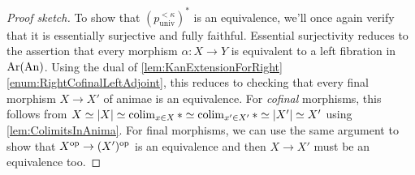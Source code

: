\begin{proof}[Proof sketch]
	To show that $(p_\mathrm{univ}^{<\kappa})^*$ is an equivalence, we'll once again verify that it is essentially surjective and fully faithful. Essential surjectivity reduces to the assertion that every morphism $\alpha\colon X\rightarrow Y$ is equivalent to a left fibration in $\operatorname{Ar}(\mathrm{An})$. Using the dual of \cref{lem:KanExtensionForRight}\cref{enum:RightCofinalLeftAdjoint}, this reduces to checking that every final morphism $X\rightarrow X'$ of animae is an equivalence. For \emph{cofinal} morphisms, this follows from $X\simeq \left|X\right|\simeq \colimit_{x\in X}*\simeq \colimit_{x'\in X'}*\simeq \left|X'\right|\simeq X'$ using \cref{lem:ColimitsInAnima}. For final morphisms, we can use the same argument to show that $X^{\mathrm{op}}\rightarrow (X')^{\mathrm{op}}$ is an equivalence and then $X\rightarrow X'$ must be an equivalence too.
	

\end{proof}
